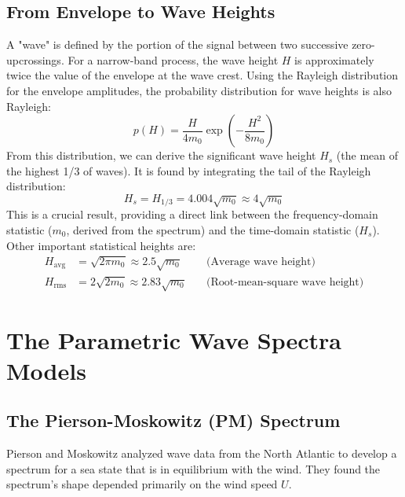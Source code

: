 \documentclass[11pt,letterpaper]{article}
\begin{document}
\subsection{From Envelope to Wave Heights}
A "wave" is defined by the portion of the signal between two successive zero-upcrossings. For a narrow-band process, the wave height $H$ is approximately twice the value of the envelope at the wave crest. Using the Rayleigh distribution for the envelope amplitudes, the probability distribution for wave heights is also Rayleigh:
\begin{equation}
p(H) = \frac{H}{4m_0} \exp\left( -\frac{H^2}{8m_0} \right)
\end{equation}
From this distribution, we can derive the significant wave height $H_s$ (the mean of the highest 1/3 of waves). It is found by integrating the tail of the Rayleigh distribution:
\begin{equation}
H_s = H_{1/3} = 4.004 \sqrt{m_0} \approx 4\sqrt{m_0}
\end{equation}
This is a crucial result, providing a direct link between the frequency-domain statistic ($m_0$, derived from the spectrum) and the time-domain statistic ($H_s$). Other important statistical heights are:
\begin{align}
H_{\text{avg}} &= \sqrt{2\pi m_0} \approx 2.5\sqrt{m_0} \quad &\text{(Average wave height)} \\
H_{\text{rms}} &= 2\sqrt{2m_0} \approx 2.83\sqrt{m_0} \quad &\text{(Root-mean-square wave height)}
\end{align}

\section{The Parametric Wave Spectra Models}
\subsection{The Pierson-Moskowitz (PM) Spectrum}
Pierson and Moskowitz analyzed wave data from the North Atlantic to develop a spectrum for a sea state that is in equilibrium with the wind. They found the spectrum's shape depended primarily on the wind speed $U$.\newpage
\end{document}
